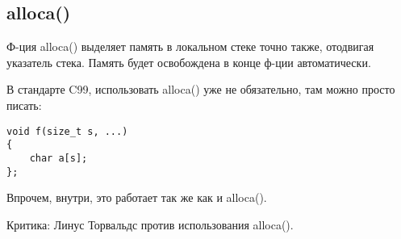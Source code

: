 ﻿\subsection{alloca()}

Ф-ция alloca() выделяет память в локальном стеке точно также, отодвигая указатель стека\cite[1.2.4]{REBook}.
Память будет освобождена в конце ф-ции автоматически.

В стандарте C99, использовать alloca() уже не обязательно, там можно просто писать:

\begin{lstlisting}
void f(size_t s, ...)
{
	char a[s];
};
\end{lstlisting}

Впрочем, внутри, это работает так же как и alloca().

Критика: Линус Торвальдс против использования alloca()\cite{Torvalds:2003}.
